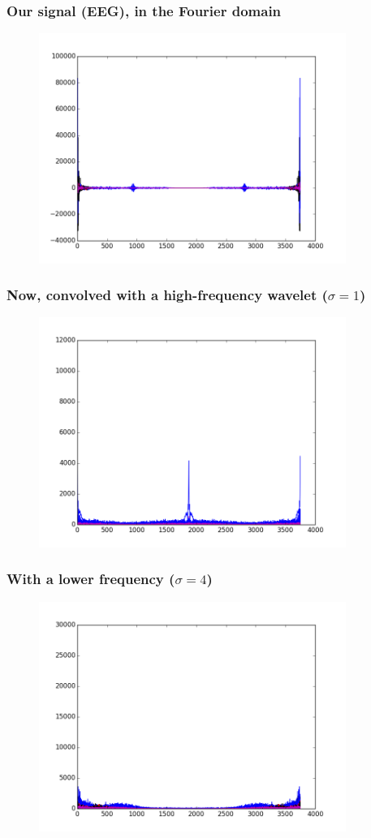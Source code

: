 \documentclass{beamer}
\begin{document}
\begin{frame}
	\frametitle{Our signal (EEG), in the Fourier domain}
	\begin{figure}
		\centering
		\includegraphics[width=10cm]{../__fft_eeg.png}
	\end{figure}
\end{frame}

\begin{frame}
	\frametitle{Now, convolved with a high-frequency wavelet ($\sigma=1$)}
	\begin{figure}
		\centering
		\includegraphics[width=10cm]{../__sig1_eeg_0.png}
	\end{figure}
\end{frame}

\begin{frame}
	\frametitle{With a lower frequency ($\sigma=4$)}
	\begin{figure}
		\centering
		\includegraphics[width=10cm]{../__sig1_eeg_1.png}
	\end{figure}
\end{frame}
\end{document}
